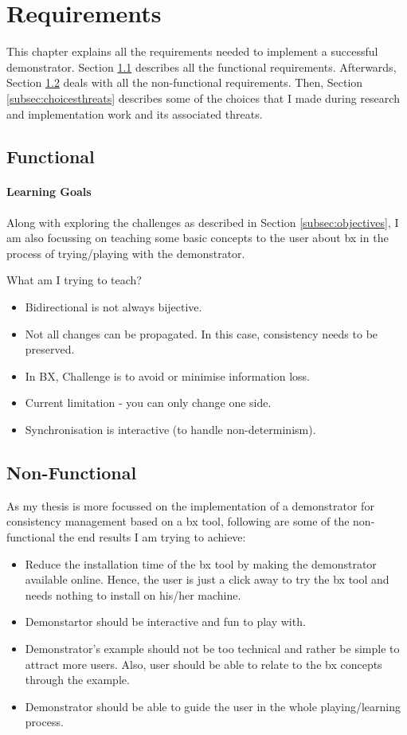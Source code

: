 \section{Requirements}\label{sec:requirements}
This chapter explains all the requirements needed to implement a successful demonstrator. Section \ref{subsec:functionalreq} describes all the functional requirements. Afterwards, Section \ref{subsec:nonfunctionalreq} deals with all the non-functional requirements. Then, Section \ref{subsec:choicesthreats} describes some of the choices that I made during research and  implementation work and its associated threats. 

\subsection{Functional}\label{subsec:functionalreq}
\paragraph{Learning Goals}
Along with exploring the challenges as described in Section \ref{subsec:objectives}, I am also focussing on teaching some basic concepts to the user about bx in the process of trying/playing with the demonstrator.

What am I trying to teach?
\begin{itemize} 
	\item {Bidirectional is not always bijective.} 
	\item {Not all changes can be propagated. In this case, consistency needs to be preserved.}
	\item {In BX, Challenge is to avoid or minimise information loss.}
	\item {Current limitation - you can only change one side.}
	\item {Synchronisation is interactive (to handle non-determinism).}	
\end{itemize}
\subsection{Non-Functional}\label{subsec:nonfunctionalreq}
As my thesis is more focussed on the implementation of a demonstrator for consistency management based on a bx tool, following are some of the non-functional the end results I am trying to achieve:
\begin{itemize} 
	\item {Reduce the installation time of the bx tool by making the demonstrator available online. Hence, the user is just a click away to try the bx tool and needs nothing to install on his/her machine.} 
	\item {Demonstartor should be interactive and fun to play with.}
	\item {Demonstrator's example should not be too technical and rather be simple to attract more users. Also, user should be able to relate to the bx concepts through the example.}
	\item {Demonstrator should be able to guide the user in the whole playing/learning process.}
\end{itemize}
